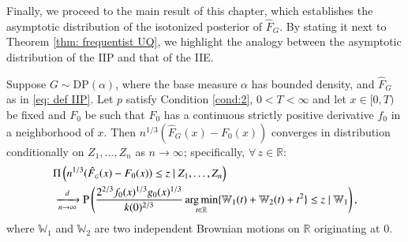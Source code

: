 Finally, we proceed to the main result of this chapter, which establishes the asymptotic distribution of the isotonized posterior of $\hat{F}_{\scriptscriptstyle{G}}$. By stating it next to Theorem \ref{thm: frequentist UQ}, we highlight the analogy between the asymptotic distribution of the IIP and that of the IIE.

\begin{theorem}\label{thm: bayesian UQ}
Suppose $G \sim \mathrm{DP}(\alpha)$, where the base measure $\alpha$ has bounded density, and $\hat{F}_{\scriptscriptstyle{G}}$ as in \eqref{eq: def IIP}. Let $p$ satisfy Condition \ref{cond:2}, $0 < T < \infty$ and let $x \in [0, T)$ be fixed and $F_0$ be such that $F_0$ has a continuous strictly positive derivative $f_0$ in a neighborhood of $x$. Then $n^{1/3}(\hat{F}_{\scriptscriptstyle{G}}(x) - F_0(x))$ converges in distribution conditionally on $Z_1, \dots, Z_n$ as $n \to \infty$; specifically, $\forall \, z \in \mathbb{R}$:
\begin{align}
&\Pi \left( n^{1/3} (\hat{F}_{\scriptscriptstyle{G}}(x) - F_0(x)) \le z \mid Z_1, \dots, Z_n \right) \\
&\xrightarrow[n \to \infty]{d}  \mathrm{P} \left( \frac{2^{2/3} f_0(x)^{1/3} g_0(x)^{1/3}}{k(0)^{2/3}} \operatorname*{arg\,min}_{t \in \mathbb{R}} \{\mathbb{W}_1(t) + \mathbb{W}_2(t) + t^2 \} \le z \mid \mathbb{W}_1 \right),
\end{align}
where $\mathbb{W}_1$ and $\mathbb{W}_2$ are two independent Brownian motions on $\mathbb{R}$ originating at $0$.
\end{theorem}

